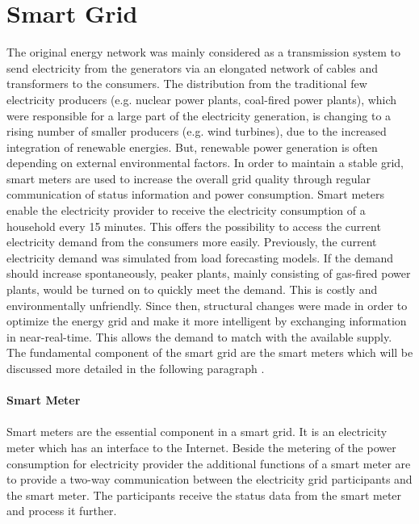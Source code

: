 \section{Smart Grid}
The original energy network was mainly considered as a transmission system to send electricity from the generators via an elongated network of cables and transformers to the consumers.%
The distribution from the traditional few electricity producers (e.g. nuclear power plants, coal-fired power plants), which were responsible for a large part of the electricity generation, is changing to a rising number of smaller producers (e.g. wind turbines), due to the increased integration of renewable energies. %
But, renewable power generation is often depending on external environmental factors. In order to maintain a stable grid, smart meters are used to increase the overall grid quality through regular communication of status information and power consumption. Smart meters enable the electricity provider to receive the electricity consumption of a household every 15 minutes. This offers the possibility to access the current electricity demand from the consumers more easily. Previously, the current electricity demand was simulated from load forecasting models. If the demand should increase spontaneously, peaker plants, mainly consisting of gas-fired power plants, would be turned on to quickly meet the demand. This is costly and environmentally unfriendly. 
Since then, structural changes were made in order to optimize the energy grid and make it more intelligent by exchanging information in near-real-time. This allows the demand to match with the available supply. The fundamental component of the smart grid are the smart meters which will be discussed more detailed in the following paragraph \cite{fan2012smart}\cite{zeadally2013towards}.\\
\\
\textbf{Smart Meter}
\\
\\
Smart meters are the essential component in a smart grid. It is an electricity meter which has an interface to the Internet. Beside the metering of the power consumption for electricity provider the additional functions of a smart meter are to provide a two-way communication between the electricity grid participants and the smart meter. The participants receive the status data from the smart meter and process it further.
